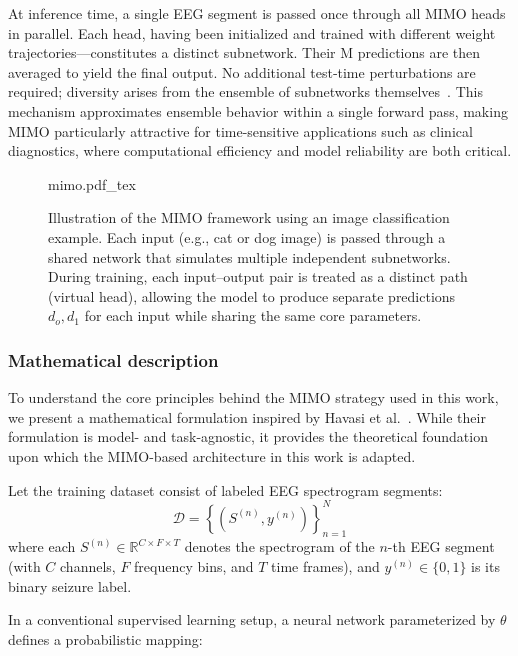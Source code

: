 At inference time, a single EEG segment is passed once through all MIMO heads in parallel. Each head, having been initialized and trained with different weight trajectories—constitutes a distinct subnetwork. Their M predictions are then averaged to yield the final output. No additional test‐time perturbations are required; diversity arises from the ensemble of subnetworks themselves~\cite{havasi2020training}. This mechanism approximates ensemble behavior within a single forward pass, making MIMO particularly attractive for time-sensitive applications such as clinical diagnostics, where computational efficiency and model reliability are both critical.

\begin{figure}[htb]
	\centering
    \def\svgwidth{350pt}
 	{mimo.pdf_tex} 	 	
	\caption[Illustration of the MIMO framework]{Illustration of the MIMO framework using an image classification example. Each input (e.g., cat or dog image) is passed through a shared network that simulates multiple independent subnetworks. During training, each input–output pair is treated as a distinct path (virtual head), allowing the model to produce separate predictions \( d_o, d_1 \)  for each input while sharing the same core parameters.}
	\label{fig:mimo}
\end{figure}

\subsubsection{Mathematical description}
To understand the core principles behind the MIMO strategy used in this work, we present a mathematical formulation inspired by Havasi et al.~\cite{modelMIMO}. While their formulation is model- and task-agnostic, it provides the theoretical foundation upon which the MIMO-based architecture in this work is adapted.

Let the training dataset consist of labeled EEG spectrogram segments:
\begin{equation}
\mathcal{D} = \left\{ \left(S^{(n)}, y^{(n)}\right) \right\}_{n=1}^{N}
\end{equation}
where each \( S^{(n)} \in \mathbb{R}^{C \times F \times T} \) denotes the spectrogram of the \( n \)-th EEG segment (with \( C \) channels, \( F \) frequency bins, and \( T \) time frames), and \( y^{(n)} \in \{0, 1\} \) is its binary seizure label.

In a conventional supervised learning setup, a neural network parameterized by \( \theta \) defines a probabilistic mapping:

